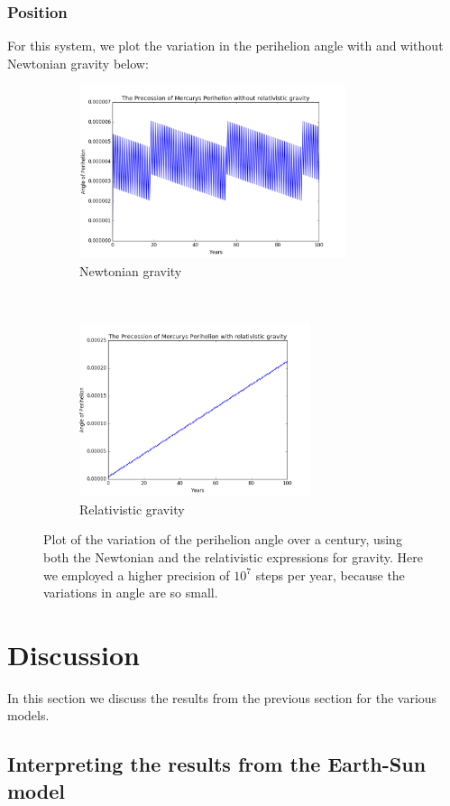 \documentclass[a4paper, 10pt]{article}
\begin{document}
\subsubsection{Position}
For this system, we plot the variation in the perihelion angle with and without Newtonian gravity below:
\begin{figure}[!ht]
    \centering
    \begin{subfigure}[H!]{0.5\textwidth}
        \centering
        \includegraphics[height=2.0in]{angleNoRel2.png}
        \caption{Newtonian gravity}
    \end{subfigure}%
    ~ 
    \begin{subfigure}[H!]{0.5\textwidth}
        \centering
        \includegraphics[height=2.0in]{angle.png}
        \caption{Relativistic gravity}
    \end{subfigure}
    \caption{Plot of the variation of the perihelion angle over a century, using both the Newtonian and the relativistic expressions for gravity. Here we employed a higher precision of $10^7$ steps per year, because the variations in angle are so small.} \label{fig:precession}
\end{figure}
\newpage
\section{Discussion}
In this section we discuss the results from the previous section for the various models.
\subsection{Interpreting the results from the Earth-Sun model}
\end{document}
